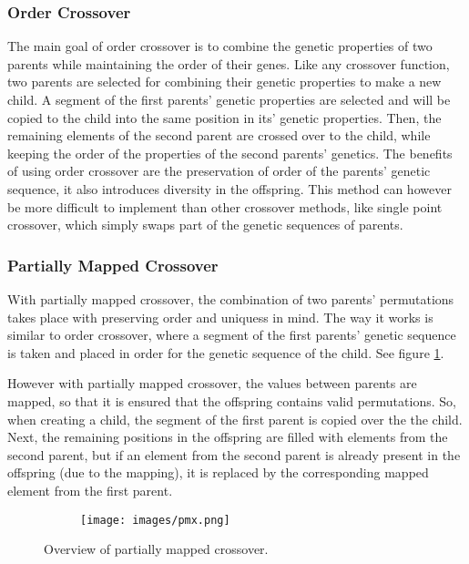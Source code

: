 \documentclass{article}
\begin{document}
\bigskip
\subsubsection{Order Crossover}
The main goal of order crossover is to combine the genetic properties of two parents while maintaining the order of their genes. Like any crossover function, two parents are selected for combining their genetic properties to make a new child. A segment of the first parents' genetic properties are selected and will be copied to the child into the same position in its' genetic properties. Then, the remaining elements of the second parent are crossed over to the child, while keeping the order of the properties of the second parents' genetics.
\smallbreak
The benefits of using order crossover are the preservation of order of the parents' genetic sequence, it also introduces diversity in the offspring. This method can however be more difficult to implement than other crossover methods, like single point crossover, which simply swaps part of the genetic sequences of parents.

\bigskip 
\subsubsection{Partially Mapped Crossover}
With partially mapped crossover, the combination of two parents' permutations takes place with preserving order and uniquess in mind. The way it works is similar to order crossover, where a segment of the first parents' genetic sequence is taken and placed in order for the genetic sequence of the child. See figure \ref{fig:pmx}.

\smallskip
However with partially mapped crossover, the values between parents are mapped, so that it is ensured that the offspring contains valid permutations. So, when creating a child, the segment of the first parent is copied over the the child. Next, the remaining positions in the offspring are filled with elements from the second parent, but if an element from the second parent is already present in the offspring (due to the mapping), it is replaced by the corresponding mapped element from the first parent.

\begin{figure}
  \centering
  \begin{subfigure}[H]{0.6\linewidth}
    \texttt{[image: images/pmx.png]}
  \end{subfigure}
  \caption{Overview of partially mapped crossover.}
  \label{fig:pmx}
\end{figure}
\end{document}
